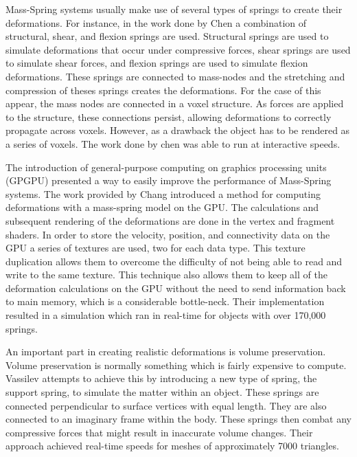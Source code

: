 Mass-Spring systems usually make use of several types of springs to create their deformations. For
instance, in the work done by Chen \etal \cite{Physically-Based-Animation-of-Volumetric-Objects} a
combination of structural, shear, and flexion springs are used. Structural springs are used to
simulate deformations that occur under compressive forces, shear springs are used to simulate shear
forces, and flexion springs are used to simulate flexion deformations. %
These springs are connected to mass-nodes and the stretching and compression of theses springs 
creates the deformations. For the case of this appear, the mass nodes are connected in a voxel 
structure. As forces are applied to the structure, these connections persist, allowing deformations
to correctly propagate across voxels. However, as a drawback the object has to be rendered as a 
series of voxels. The work done by chen \etal was able to run at interactive speeds.

The introduction of general-purpose computing on graphics processing units (GPGPU) presented a way 
to easily improve the performance of Mass-Spring systems. The work provided by Chang \etal 
\cite{Deformable-Object-Simulation-in-Virtual-Environment} 
 introduced a method for computing deformations 
with a mass-spring model on the GPU. The calculations and subsequent rendering of the deformations 
are done in the vertex and fragment shaders. In order to store the velocity, position, and 
connectivity data on the GPU a series of textures are used, two for each data type. This texture 
duplication allows them to overcome the difficulty of not being able to read and write to the same 
texture. This technique also allows them to keep all of the deformation calculations on the GPU 
without the need to send information back to main memory, which is a considerable bottle-neck. Their 
implementation resulted in a simulation which ran in real-time for objects with over 170,000 
springs.

An important part in creating realistic deformations is volume preservation. Volume preservation is 
normally something which is fairly expensive to compute. Vassilev \etal 
\cite{Simulation-of-a-Deformable-Human-Body} 
 attempts to achieve this by introducing a new type of spring, the support spring, to simulate the 
matter within an object. These springs are connected perpendicular to surface vertices with equal 
length. They are also connected to an imaginary frame within the body. These springs then combat any 
compressive forces that might result in inaccurate volume changes. Their approach achieved real-time 
speeds for meshes of approximately 7000 triangles. 

